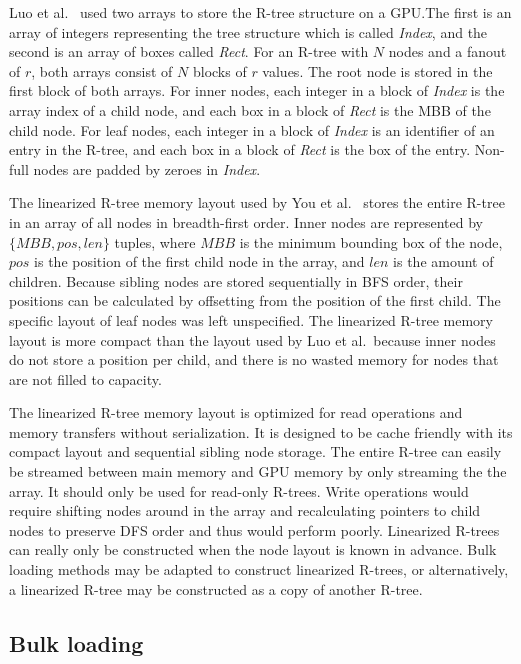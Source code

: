 Luo et al.~\cite{luo2012parallel} used two arrays to store the R-tree structure on a GPU.\@ The first is an array of integers representing the tree structure which is called \emph{Index}, and the second is an array of boxes called \emph{Rect}. For an R-tree with \(N\) nodes and a fanout of \(r\), both arrays consist of \(N\) blocks of \(r\) values. The root node is stored in the first block of both arrays. For inner nodes, each integer in a block of \emph{Index} is the array index of a child node, and each box in a block of \emph{Rect} is the MBB of the child node. For leaf nodes, each integer in a block of \emph{Index} is an identifier of an entry in the R-tree, and each box in a block of \emph{Rect} is the box of the entry. Non-full nodes are padded by zeroes in \emph{Index}.

The linearized R-tree memory layout used by You et al.~\cite{you2013parallel} stores the entire R-tree in an array of all nodes in breadth-first order. Inner nodes are represented by \(\{MBB, pos, len\}\) tuples, where \(MBB\) is the minimum bounding box of the node, \(pos\) is the position of the first child node in the array, and \(len\) is the amount of children. Because sibling nodes are stored sequentially in BFS order, their positions can be calculated by offsetting from the position of the first child. The specific layout of leaf nodes was left unspecified. The linearized R-tree memory layout is more compact than the layout used by Luo et al.~because inner nodes do not store a position per child, and there is no wasted memory for nodes that are not filled to capacity.

The linearized R-tree memory layout is optimized for read operations and memory transfers without serialization. It is designed to be cache friendly with its compact layout and sequential sibling node storage. The entire R-tree can easily be streamed between main memory and GPU memory by only streaming the the array. It should only be used for read-only R-trees. Write operations would require shifting nodes around in the array and recalculating pointers to child nodes to preserve DFS order and thus would perform poorly. Linearized R-trees can really only be constructed when the node layout is known in advance. Bulk loading methods may be adapted to construct linearized R-trees, or alternatively, a linearized R-tree may be constructed as a copy of another R-tree.

\subsection{Bulk loading}


